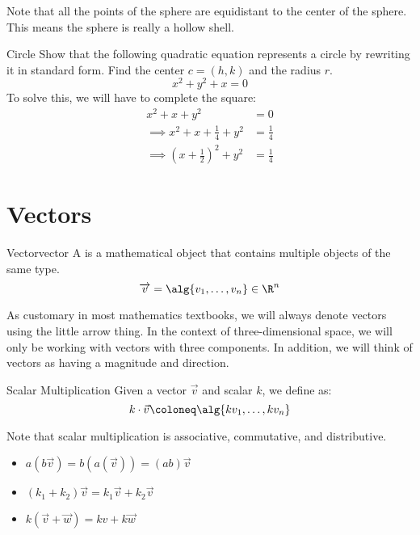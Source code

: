 \documentclass[12pt]{report}
\begin{document}
Note that all the points of the sphere are equidistant to the center of the sphere. This means the sphere is really a hollow shell.

\begin{exbox}{Circle}{}
    Show that the following quadratic equation represents a circle by rewriting it in standard form. Find the center $c = (h,k)$ and the radius $r$.
    \[ x^2 + y^2 + x = 0 \]
    \tcblower
    To solve this, we will have to complete the square:
    \begin{align*}
        x^2 + x + y^2 &= 0 \\
        \implies x^2 + x + \frac{1}{4} + y^2 &= \frac{1}{4} \\
        \implies \left( x + \frac12 \right)^2 + y^2 &= \frac14
    \end{align*}
\end{exbox}

\section{Vectors}

\begin{dfnbox}{Vector}{vector}
    A  is a mathematical object that contains multiple objects of the same type.
    \tcblower
    \[ \overrightarrow{v} = \alg{v_1, \ldots, v_n} \in \R^n \]
\end{dfnbox}

As customary in most mathematics textbooks, we will always denote vectors using the little arrow thing. In the context of three-dimensional space, we will only be working with vectors with three components. In addition, we will think of vectors as having a magnitude and direction.

\begin{dfnbox}{Scalar Multiplication}{}
    Given a vector $\vec{v}$ and scalar $k$, we define  as:
    \[ k \cdot \vec{v} \coloneq \alg{kv_1, \ldots, kv_n} \]
\end{dfnbox}

Note that scalar multiplication is associative, commutative, and distributive.
\begin{itemize}
    \item $a(b\vec{v}) = b(a(\vec{v})) = (ab) \vec{v}$
    \item $(k_1 + k_2) \vec{v} = k_1 \vec{v} + k_2 \vec{v}$
    \item $k (\vec{v} + \vec{w}) = k{v} + k\vec{w}$
\end{itemize}
\end{document}
